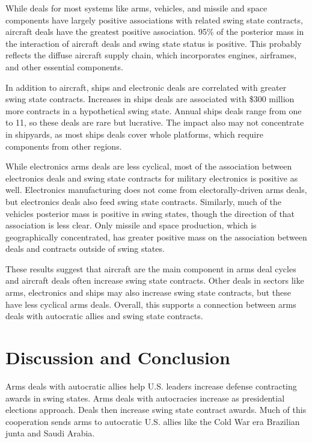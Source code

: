 \documentclass[12pt]{article}
\begin{document}
While deals for most systems like arms, vehicles, and missile and space components have largely positive associations with related swing state contracts, aircraft deals have the greatest positive association. 
95\% of the posterior mass in the interaction of aircraft deals and swing state status is positive.
This probably reflects the diffuse aircraft supply chain, which incorporates engines, airframes, and other essential components. 


In addition to aircraft, ships and electronic deals are correlated with greater swing state contracts. 
Increases in ships deals are associated with \$300 million more contracts in a hypothetical swing state. 
Annual ships deals range from one to 11, so these deals are rare but lucrative. 
The impact also may not concentrate in shipyards, as most ships deals cover whole platforms, which require components from other regions. 

 
While electronics arms deals are less cyclical, most of the association between electronics deals and swing state contracts for military electronics is positive as well.
Electronics manufacturing does not come from electorally-driven arms deals, but electronics deals also feed swing state contracts. 
Similarly, much of the vehicles posterior mass is positive in swing states, though the direction of that association is less clear. 
Only missile and space production, which is geographically concentrated, has greater positive mass on the association between deals and contracts outside of swing states.


These results suggest that aircraft are the main component in arms deal cycles and aircraft deals often increase swing state contracts. 
Other deals in sectors like arms, electronics and ships may also increase swing state contracts, but these have less cyclical arms deals. 
Overall, this supports a connection between arms deals with autocratic allies and swing state contracts.  



\section{Discussion and Conclusion}


Arms deals with autocratic allies help U.S. leaders increase defense contracting awards in swing states. 
Arms deals with autocracies increase as presidential elections approach.
Deals then increase swing state contract awards. 
Much of this cooperation sends arms to autocratic U.S. allies like the Cold War era Brazilian junta and Saudi Arabia.
\end{document}
